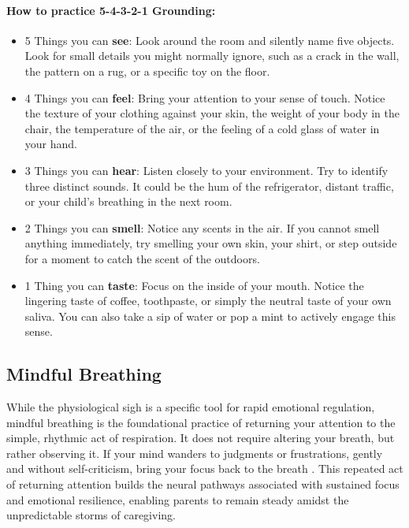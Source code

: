 \paragraph{How to practice 5-4-3-2-1 Grounding:}
\begin{itemize}
    \item 5 Things you can \textbf{see}: Look around the room and silently name five objects. 
    Look for small details you might normally ignore, such as a crack in the wall, the pattern on a rug, or a specific toy on the floor.
    \item 4 Things you can \textbf{feel}: Bring your attention to your sense of touch. 
    Notice the texture of your clothing against your skin, the weight of your body in the chair, the temperature of the air, or the feeling of a cold glass of water in your hand.
    \item 3 Things you can \textbf{hear}: Listen closely to your environment. 
    Try to identify three distinct sounds. 
    It could be the hum of the refrigerator, distant traffic, or your child's breathing in the next room.
    \item 2 Things you can \textbf{smell}: Notice any scents in the air. 
    If you cannot smell anything immediately, try smelling your own skin, your shirt, or step outside for a moment to catch the scent of the outdoors.
    \item 1 Thing you can \textbf{taste}: Focus on the inside of your mouth. 
    Notice the lingering taste of coffee, toothpaste, or simply the neutral taste of your own saliva. 
    You can also take a sip of water or pop a mint to actively engage this sense.
\end{itemize}

\subsection{Mindful Breathing}
While the physiological sigh is a specific tool for rapid emotional regulation, mindful breathing is the foundational practice of returning your attention to the simple, rhythmic act of respiration.
It does not require altering your breath, but rather observing it.
If your mind wanders to judgments or frustrations, gently and without self-criticism, bring your focus back to the breath \citep{neff2003}.
This repeated act of returning attention builds the neural pathways associated with sustained focus and emotional resilience, enabling parents to remain steady amidst the unpredictable storms of caregiving.

